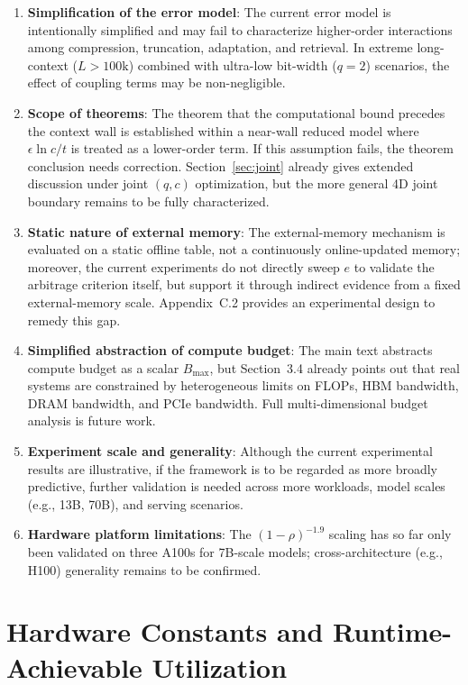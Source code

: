 \documentclass[11pt,a4paper]{article}
\theoremstyle{plain}
\theoremstyle{definition}
\begin{document}
\begin{enumerate}
    \item \textbf{Simplification of the error model}: The current error model is intentionally simplified and may fail to characterize higher-order interactions among compression, truncation, adaptation, and retrieval. In extreme long-context ($L > 100\text{k}$) combined with ultra-low bit-width ($q=2$) scenarios, the effect of coupling terms may be non-negligible.
    \item \textbf{Scope of theorems}: The theorem that the computational bound precedes the context wall is established within a near-wall reduced model where $\epsilon \ln c / t$ is treated as a lower-order term. If this assumption fails, the theorem conclusion needs correction. Section~\ref{sec:joint} already gives extended discussion under joint $(q,c)$ optimization, but the more general 4D joint boundary remains to be fully characterized.
    \item \textbf{Static nature of external memory}: The external-memory mechanism is evaluated on a static offline table, not a continuously online-updated memory; moreover, the current experiments do not directly sweep $e$ to validate the arbitrage criterion itself, but support it through indirect evidence from a fixed external-memory scale. Appendix~C.2 provides an experimental design to remedy this gap.
    \item \textbf{Simplified abstraction of compute budget}: The main text abstracts compute budget as a scalar $B_{\max}$, but Section~3.4 already points out that real systems are constrained by heterogeneous limits on FLOPs, HBM bandwidth, DRAM bandwidth, and PCIe bandwidth. Full multi-dimensional budget analysis is future work.
    \item \textbf{Experiment scale and generality}: Although the current experimental results are illustrative, if the framework is to be regarded as more broadly predictive, further validation is needed across more workloads, model scales (e.g., 13B, 70B), and serving scenarios.
    \item \textbf{Hardware platform limitations}: The $(1-\rho)^{-1.9}$ scaling has so far only been validated on three A100s for 7B-scale models; cross-architecture (e.g., H100) generality remains to be confirmed.
\end{enumerate}

\appendix

\section{Hardware Constants and Runtime-Achievable Utilization}\label{app:hardware}
\end{document}
